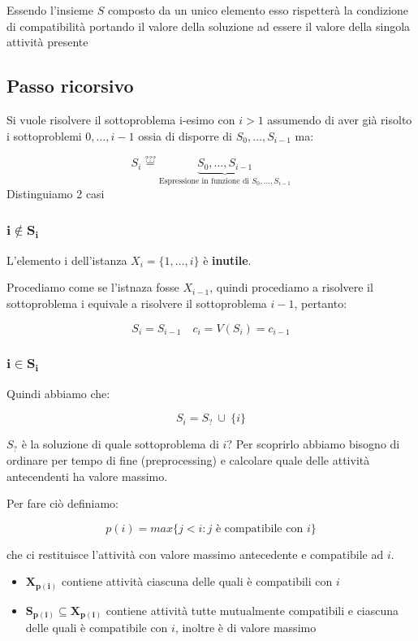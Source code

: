 Essendo l'insieme $S$ composto da un unico elemento esso rispetterà la condizione di compatibilità portando il valore della soluzione ad essere il valore della singola attività presente

\subsection{Passo ricorsivo}
Si vuole risolvere il sottoproblema i-esimo con $i>1$ assumendo di aver già risolto i sottoproblemi $0,\dots,i-1$ ossia di disporre di $S_0,\dots, S_{i-1}$ ma:

{
    \large
    $$
        S_i \overset{???}{=} \underbrace{S_0, \dots, S_{i-1}}_{\text{Espressione in funzione di $S_0,\dots,S_{i-1}$}}
    $$
}
Distinguiamo 2 casi

\subsubsection{$\mathbf{i \not \in S_i}$}
L'elemento i dell'istanza $X_i = \{1,\dots,i\}$ è \textbf{inutile}.

Procediamo come se l'istnaza fosse $X_{i-1}$, quindi procediamo a risolvere il sottoproblema i equivale a risolvere il sottoproblema $i-1$, pertanto:

{
    \large
    $$
        S_i = S_{i-1} \quad c_i = V(S_i)=c_{i-1}
    $$
}

\subsubsection{$\mathbf{i \in S_i}$}
Quindi abbiamo che:

{
    \large
    $$
        S_i = S_? \ \cup \ \{i\}
    $$
}

$S_?$ è la soluzione di quale sottoproblema di $i?$ Per scoprirlo abbiamo bisogno di ordinare per tempo di fine (preprocessing) e calcolare quale delle attività antecendenti ha valore massimo.

Per fare ciò definiamo:

{
    \large

    $$
        p(i) = max\{j<i:\text{$j$ è compatibile con $i$}\}
    $$
}

che ci restituisce l'attività con valore massimo antecedente e compatibile ad $i$.

\begin{itemize}
    \item $\mathbf{X_{p(i)}}$ contiene attività ciascuna delle quali è compatibili con $i$
    \item $\mathbf{S_{p(i)} \subseteq X_{p(i)}}$ contiene attività tutte mutualmente compatibili e ciascuna delle quali è compatibile con $i$, inoltre è di valore massimo
\end{itemize}

